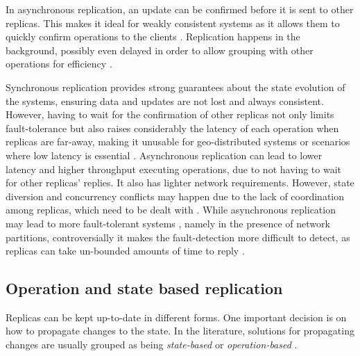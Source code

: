 In asynchronous replication, an update can be confirmed before it is sent to other replicas.
This makes it ideal for weakly consistent systems as it allows them to quickly confirm operations to the clients \cite{cops}.
Replication happens in the background, possibly even delayed in order to allow grouping with other operations for efficiency \cite{dynamo, cure}.

Synchronous replication provides strong guarantees about the state evolution of the systems, ensuring data and updates are not lost and always consistent.
However, having to wait for the confirmation of other replicas not only limits fault-tolerance \cite{spanner} but also raises considerably the latency of each operation when replicas are far-away, making it unusable for geo-distributed systems or scenarios where low latency is essential \cite{slog}.
Asynchronous replication can lead to lower latency and higher throughput executing operations, due to not having to wait for other replicas' replies.
It also has lighter network requirements.
However, state diversion and concurrency conflicts may happen due to the lack of coordination among replicas, which need to be dealt with \cite{dynamo}.
While asynchronous replication may lead to more fault-tolerant systems \cite{dynamo, cassandra, cops}, namely in the presence of network partitions, controversially it makes the fault-detection more difficult to detect, as replicas can take un-bounded amounts of time to reply \cite{cap}.


\subsection{Operation and state based replication}
\label{subsec:operationStateReplication}

Replicas can be kept up-to-date in different forms.
One important decision is on how to propagate changes to the state.
In the literature, solutions for propagating changes are usually grouped as being \emph{state-based} or \emph{operation-based} \cite{crdt}.


